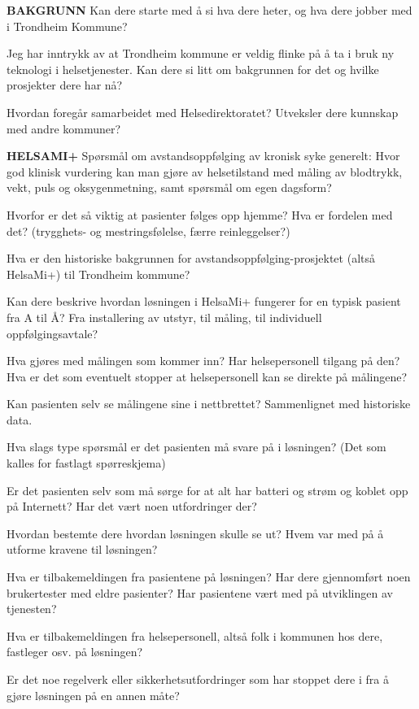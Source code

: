 \textbf{BAKGRUNN}
Kan dere starte med å si hva dere heter, og hva dere jobber med i Trondheim Kommune?
 
Jeg har inntrykk av at Trondheim kommune er veldig flinke på å ta i bruk ny teknologi i helsetjenester. Kan dere si litt om bakgrunnen for det og hvilke prosjekter dere har nå?
 
Hvordan foregår samarbeidet med Helsedirektoratet? Utveksler dere kunnskap med andre kommuner?
 
\textbf{HELSAMI+}
Spørsmål om avstandsoppfølging av kronisk syke generelt:
Hvor god klinisk vurdering kan man gjøre av helsetilstand med måling av blodtrykk, vekt, puls og oksygenmetning, samt spørsmål om egen dagsform?
 
Hvorfor er det så viktig at pasienter følges opp hjemme? Hva er fordelen med det? (trygghets- og mestringsfølelse, færre reinleggelser?)
 
Hva er den historiske bakgrunnen for avstandsoppfølging-prosjektet (altså HelsaMi+) til Trondheim kommune? 
 
Kan dere beskrive hvordan løsningen i HelsaMi+ fungerer for en typisk pasient fra A til Å? Fra installering av utstyr, til måling, til individuell oppfølgingsavtale?
 
Hva gjøres med målingen som kommer inn? Har helsepersonell tilgang på den? Hva er det som eventuelt stopper at helsepersonell kan se direkte på målingene?
 
Kan pasienten selv se målingene sine i nettbrettet? Sammenlignet med historiske data.
 
Hva slags type spørsmål er det pasienten må svare på i løsningen? (Det som kalles for fastlagt spørreskjema)
 
Er det pasienten selv som må sørge for at alt har batteri og strøm og koblet opp på Internett? Har det vært noen utfordringer der?
 
Hvordan bestemte dere hvordan løsningen skulle se ut? Hvem var med på å utforme kravene til løsningen? 
 
Hva er tilbakemeldingen fra pasientene på løsningen? Har dere gjennomført noen brukertester med eldre pasienter? Har pasientene vært med på utviklingen av tjenesten?
 
Hva er tilbakemeldingen fra helsepersonell, altså folk i kommunen hos dere, fastleger osv. på løsningen?
 
Er det noe regelverk eller sikkerhetsutfordringer som har stoppet dere i fra å gjøre løsningen på en annen måte?
 
